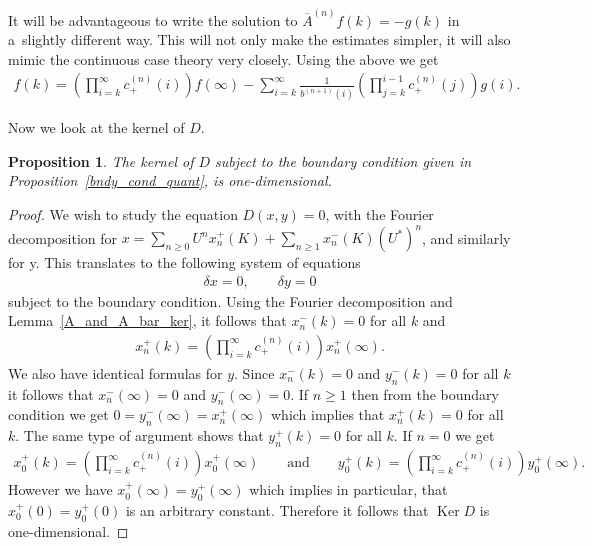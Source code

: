 \documentclass[pdftex]{sigma}
\numberwithin{equation}{section}
\newtheorem{prop}[theo]{Proposition}
{\theoremstyle{definition}
\newtheorem{rem}[theo]{Remark}
\newtheorem{defin}[theo]{Definition}
}
\DeclareMathOperator{\Ker}{Ker}
\begin{document}
It will be advantageous to write the solution to $\overline{A}^{(n)}f(k) = -g(k)$ in a~slightly dif\/ferent way.
This will not only make the estimates simpler, it will also mimic the continuous case theory very closely.
Using the above we get
\begin{gather*}
f(k) = \left(\prod\limits_{i=k}^\infty c_+^{(n)}(i)\right)f(\infty) - \sum\limits_{i=k}^\infty
\frac{1}{b^{(n+1)}(i)}\left(\prod\limits_{j=k}^{i-1}c_+^{(n)}(j)\right)g(i).
\end{gather*}

Now we look at the kernel of $D$.

\begin{prop}
The kernel of $D$ subject to the boundary condition given in Proposition~{\rm \ref{bndy_cond_quant}}, is one-dimensional.
\end{prop}

\begin{proof}
We wish to study the equation $D(x,y) = 0$, with the Fourier decomposition for $x= \sum\limits_{n\ge0} U^n x_n^+(K) +
\sum\limits_{n\ge1} x_n^-(K)(U^*)^n$, and similarly for y.
This translates to the following system of equations
\begin{gather*}
\delta x = 0,
\qquad
\delta y = 0
\end{gather*}
subject to the boundary condition.
Using the Fourier decomposition and Lemma~\ref{A_and_A_bar_ker}, it follows that $x_n^-(k) = 0$ for all $k$ and
\begin{gather*}
x_n^+(k) = \left(\prod\limits_{i=k}^\infty c_+^{(n)}(i)\right)x_n^+(\infty).
\end{gather*}
We also have identical formulas for $y$.
Since $x_n^-(k) = 0$ and $y_n^-(k) = 0$ for all $k$ it follows that $x_n^-(\infty)=0$ and $y_n^-(\infty)= 0$.
If $n\ge1$ then from the boundary condition we get $0 = y_n^-(\infty) = x_n^+(\infty)$ which implies that $x_n^+(k)=0$
for all $k$.
The same type of argument shows that $y_n^+(k)=0$ for all $k$.
If $n=0$ we get
\begin{gather*}
x_0^+(k) = \left(\prod\limits_{i=k}^\infty c_+^{(n)}(i)\right)x_0^+(\infty)
\qquad
\textrm{and}
\qquad
y_0^+(k) = \left(\prod\limits_{i=k}^\infty c_+^{(n)}(i)\right)y_0^+(\infty).
\end{gather*}
However we have $x_0^+(\infty) = y_0^+(\infty)$ which implies in particular, that $x_0^+(0) = y_0^+(0)$ is an arbitrary
constant.
Therefore it follows that $\Ker D$ is one-dimensional.
\end{proof}
\end{document}
